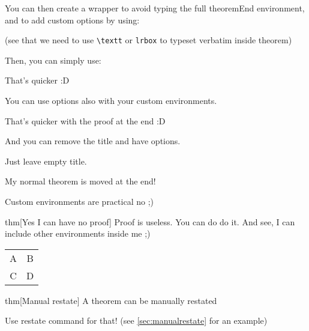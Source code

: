 \documentclass{article}
\begin{document}
\begin{thmE}
  You can then create a wrapper to avoid typing the full theoremEnd environment, and to add custom options by using:
  
  \begin{center}
    \usebox{\myEndBox}
  \end{center}
  
  \noindent (see that we need to use \texttt{\textbackslash textt} or \texttt{lrbox} to typeset verbatim inside theorem)

  Then, you can simply use:
\end{thmE}
\begin{proofEnd}
  That's quicker :D
\end{proofEnd}

\begin{thmE}
  You can use options also with your custom environments.
\end{thmE}
\begin{proofEnd}
  That's quicker with the proof at the end :D
\end{proofEnd}

\begin{thmE}[][end]
  And you can remove the title and have options.
\end{thmE}
\begin{proofE}
  Just leave empty title.
\end{proofE}

\begin{thmE}
  My normal theorem is moved at the end!
\end{thmE}
\begin{proofE}
  Custom environments are practical no ;)
\end{proofE}

\begin{theoremEnd}[]{thm}[Yes I can have no proof]
  Proof is useless. You can do do it. And see, I can include other environments inside me ;)\\
  \begin{tabular}{ c c } 
    A & B \\ 
    C & D \\ 
  \end{tabular}
\end{theoremEnd}

\begin{theoremEnd}[restate command=mymanualrestate]{thm}[Manual restate]
  A theorem can be manually restated  
\end{theoremEnd}
\begin{proofEnd}
  Use restate command for that! (see \autoref{sec:manualrestate} for an example)
\end{proofEnd}
\end{document}
